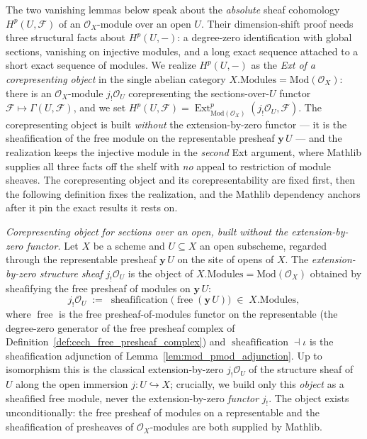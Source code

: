 The two vanishing lemmas below speak about the \emph{absolute} sheaf cohomology
\(H^p(U, \mathcal{F})\) of an \(\mathcal{O}_X\)-module over an open \(U\). Their
dimension-shift proof needs three structural facts about \(H^p(U, -)\): a degree-zero
identification with global sections, vanishing on injective modules, and a long exact
sequence attached to a short exact sequence of modules. We realize \(H^p(U, -)\) as the
\emph{Ext of a corepresenting object} in the single abelian category
\(X.\mathrm{Modules} = \mathrm{Mod}(\mathcal{O}_X)\): there is an
\(\mathcal{O}_X\)-module \(j_!\mathcal{O}_U\) corepresenting the
sections-over-\(U\) functor \(\mathcal{F} \mapsto \Gamma(U, \mathcal{F})\), and we set
\(H^p(U, \mathcal{F}) = \operatorname{Ext}^p_{\mathrm{Mod}(\mathcal{O}_X)}(j_!\mathcal{O}_U,
\mathcal{F})\). The corepresenting object is built \emph{without} the extension-by-zero
functor — it is the sheafification of the free module on the representable presheaf
\(\mathbf{y}\,U\) — and the realization keeps the injective module in the \emph{second}
Ext argument, where Mathlib supplies all three facts off the shelf with \emph{no} appeal
to restriction of module sheaves. The corepresenting object and its corepresentability
are fixed first, then the following definition fixes the realization, and the Mathlib
dependency anchors after it pin the exact results it rests on.

\begin{definition}\leanok
  \label{def:jshriek_ou}
  \textit{Corepresenting object for sections over an open, built without the
  extension-by-zero functor.}
  Let \(X\) be a scheme and \(U \subseteq X\) an open subscheme, regarded through the
  representable presheaf \(\mathbf{y}\,U\) on the site of opens of \(X\). The
  \emph{extension-by-zero structure sheaf} \(j_!\mathcal{O}_U\) is the object of
  \(X.\mathrm{Modules} = \mathrm{Mod}(\mathcal{O}_X)\) obtained by sheafifying the free
  presheaf of modules on \(\mathbf{y}\,U\):
  \[
    j_!\mathcal{O}_U \;:=\; \operatorname{sheafification}\bigl(
      \operatorname{free}(\mathbf{y}\,U)\bigr)
    \;\in\; X.\mathrm{Modules},
  \]
  where \(\operatorname{free}\) is the free presheaf-of-modules functor on the
  representable (the degree-zero generator of the free presheaf complex of
  Definition~\ref{def:cech_free_presheaf_complex}) and
  \(\operatorname{sheafification} \dashv \iota\) is the sheafification adjunction of
  Lemma~\ref{lem:mod_pmod_adjunction}. Up to isomorphism this is the classical
  extension-by-zero \(j_!\mathcal{O}_U\) of the structure sheaf of \(U\) along the open
  immersion \(j : U \hookrightarrow X\); crucially, we build only this \emph{object} as a
  sheafified free module, never the extension-by-zero \emph{functor} \(j_!\). The object
  exists unconditionally: the free presheaf of modules on a representable and the
  sheafification of presheaves of \(\mathcal{O}_X\)-modules are both supplied by Mathlib.
\end{definition}


